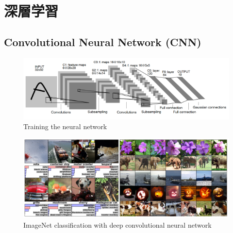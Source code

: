 
\section{深層学習}


\subsection{Convolutional Neural Network (CNN)}

\begin{figure}[h]
  \centering
  \includegraphics[keepaspectratio, scale=0.50] {images/yann_CNN.png}
  \caption{Training the neural network \cite{yann}}
  \label{Fig:yann_CNN}
\end{figure}

\begin{figure}[h]
  \centering
  \includegraphics[keepaspectratio, scale=0.30] {images/deep_convolutional_neural_networks.png}
  \caption{ImageNet classification with deep convolutional neural network \cite{alex}}
  \label{Fig:deep_convolutional_neural_networks}
\end{figure}

\newpage
